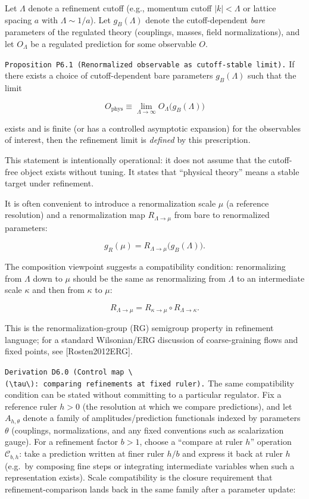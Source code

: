 \documentclass[
]{article}
\begin{document}
Let \(\Lambda\) denote a refinement cutoff (e.g., momentum cutoff
\(|k|<\Lambda\) or lattice spacing \(a\) with \(\Lambda\sim 1/a\)). Let
\(g_B(\Lambda)\) denote the cutoff-dependent \emph{bare} parameters of
the regulated theory (couplings, masses, field normalizations), and let
\(O_\Lambda\) be a regulated prediction for some observable \(O\).

\texttt{Proposition\ P6.1\ (Renormalized\ observable\ as\ cutoff-stable\ limit).}
If there exists a choice of cutoff-dependent bare parameters
\(g_B(\Lambda)\) such that the limit

\[
O_{\mathrm{phys}}
\equiv
\lim_{\Lambda\to\infty} O_\Lambda\big(g_B(\Lambda)\big)
\]

exists and is finite (or has a controlled asymptotic expansion) for the
observables of interest, then the refinement limit is \emph{defined} by
this prescription.

This statement is intentionally operational: it does not assume that the
cutoff-free object exists without tuning. It states that ``physical
theory'' means a stable target under refinement.

It is often convenient to introduce a renormalization scale \(\mu\) (a
reference resolution) and a renormalization map \(R_{\Lambda\to\mu}\)
from bare to renormalized parameters:

\[
g_R(\mu) = R_{\Lambda\to\mu}\big(g_B(\Lambda)\big).
\]

The composition viewpoint suggests a compatibility condition:
renormalizing from \(\Lambda\) down to \(\mu\) should be the same as
renormalizing from \(\Lambda\) to an intermediate scale \(\kappa\) and
then from \(\kappa\) to \(\mu\):

\[
R_{\Lambda\to\mu} = R_{\kappa\to\mu}\circ R_{\Lambda\to\kappa}.
\]

This is the renormalization-group (RG) semigroup property in refinement
language; for a standard Wilsonian/ERG discussion of coarse-graining
flows and fixed points, see {[}Rosten2012ERG{]}.

\texttt{Derivation\ D6.0\ (Control\ map\ \textbackslash{}(\textbackslash{}tau\textbackslash{}):\ comparing\ refinements\ at\ fixed\ ruler).}
The same compatibility condition can be stated without committing to a
particular regulator. Fix a reference ruler \(h>0\) (the resolution at
which we compare predictions), and let \(A_{h,\theta}\) denote a family
of amplitudes/prediction functionals indexed by parameters \(\theta\)
(couplings, normalizations, and any fixed conventions such as
scalarization gauge). For a refinement factor \(b>1\), choose a
``compare at ruler \(h\)'' operation \(\mathcal C_{b,h}\): take a
prediction written at finer ruler \(h/b\) and express it back at ruler
\(h\) (e.g.~by composing fine steps or integrating intermediate
variables when such a representation exists). Scale compatibility is the
closure requirement that refinement-comparison lands back in the same
family after a parameter update:
\end{document}
